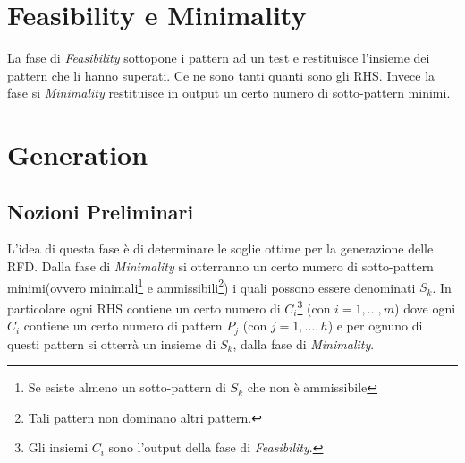 
\section{Feasibility e Minimality}
La fase di \textit{Feasibility} sottopone i pattern ad un test e restituisce l'insieme dei pattern che li hanno superati. Ce ne sono tanti quanti sono gli RHS. Invece la fase si \textit{Minimality} restituisce in output un certo numero di sotto-pattern minimi.
\section{Generation}
\subsection{Nozioni Preliminari}
L'idea di questa fase è di determinare le soglie ottime per la generazione delle RFD.
Dalla fase di \textit{Minimality} si otterranno un certo numero di sotto-pattern minimi(ovvero minimali\footnote{Se esiste almeno un sotto-pattern di $S_{k}$ che non è ammissibile} e ammissibili\footnote{Tali pattern non dominano altri pattern.}) i quali possono essere denominati $S_{k}$. In particolare ogni RHS contiene un certo numero di $C_{i}$\footnote{Gli insiemi $C_{i}$ sono l'output della fase di  \textit{Feasibility}.} (con $i=1,\dots,m$)  dove ogni $C_{i}$ contiene un certo numero di pattern $P_{j}$ (con $j = 1,\dots,h$) e per ognuno di questi pattern si otterrà un insieme di $S_{k}$, dalla fase di \textit{Minimality}.
